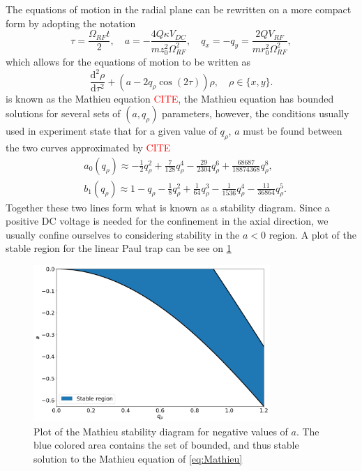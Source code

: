 The equations of motion in the radial plane can be rewritten on a more compact form by adopting the notation
\begin{equation}
    \tau = \frac{\Omega_{RF}t}{2},\quad a = -\frac{4Q\kappa V_{DC}}{mz_0^2\Omega_{RF}^2},\quad q_x = -q_y = 
    \frac{2QV_{RF}}{mr_0^2\Omega_{RF}^2},
\end{equation}
which allows for the equations of motion to be written as
\begin{equation}
    \frac{\text{d}^2\rho}{\text{d}\tau^2} + (a-2q_\rho\cos{(2\tau)})\rho,\quad \rho\in\{x,y\}
    \label{eq:Mathieu}.
\end{equation}
 is known as the Mathieu equation \textcolor{red}{CITE}, the Mathieu equation has bounded solutions for several sets of $(a,q_\rho)$ parameters,
however, the conditions usually used in experiment state that for a given value of $q_\rho$, $a$ must be found between the two curves approximated by \textcolor{red}{CITE}
\begin{align}
    &a_0(q_\rho) \approx -\frac{1}{2}q_\rho^2 +\frac{7}{128}q_\rho^4 -\frac{29}{2304}q_\rho^6+\frac{68687}{18874368}q_\rho^8,\\
    &b_1(q_\rho) \approx 1-q_\rho-\frac{1}{8}q_\rho^2+\frac{1}{64}q_\rho^3-\frac{1}{1536}q_\rho^4-\frac{11}{36864}q_\rho^5.
\end{align}
Together these two lines form what is known as a stability diagram. Since a positive DC voltage is needed for the confinement in the axial direction, we usually confine ourselves to considering stability in the $a<0$ region. A plot of the stable region for the linear Paul trap can be see on \cref{fig:Stability1}
\begin{figure}
    \includegraphics[width =0.8\textwidth]{main/Stability.png}
    \caption{Plot of the Mathieu stability diagram for negative values of $a$. The blue colored area contains the set of bounded, and thus stable solution to the Mathieu equation of \cref{eq:Mathieu}}
    \label{fig:Stability1}
\end{figure}

